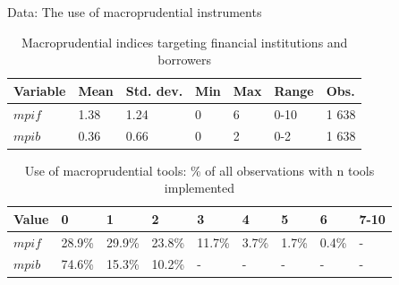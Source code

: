 \documentclass{beamer}
\begin{document}
\begin{frame}{Data: The use of macroprudential instruments}
\begin{table}[!h]
\centering
\begin{tabular}{ l l l l l l l }
\hline
Variable&Mean&Std. dev.&Min&Max&Range&Obs. \\
\hline
$mpif$&1.38&1.24&0&6&0-10&1 638 \\
$mpib$&0.36&0.66&0&2&0-2&1 638 \\
\hline
\end{tabular}
\caption{Macroprudential indices targeting financial institutions and borrowers}
\label{tab:mpi}
\end{table}

\begin{table}[!h]
\small
\centering
\begin{tabular}{ l l l l l l l l l }
\hline
Value&0&1&2&3&4&5&6&7-10\\
\hline
$mpif$&28.9\%&29.9\%&23.8\%&11.7\%&3.7\%&1.7\%&0.4\%&- \\
$mpib$&74.6\%&15.3\%&10.2\%&-&-&-&-&- \\
\hline
\end{tabular}
\caption{Use of macroprudential tools: \% of all observations with n tools implemented}
\label{tab:mpiu_use}
\end{table}
\end{frame}

\end{document}
